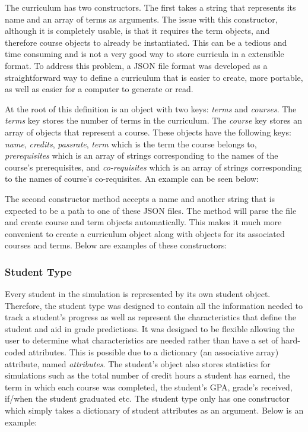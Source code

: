 \documentclass[botnum, fleqn]{unmeethesis}
\begin{document}
        The curriculum has two constructors. The first takes a string that represents its name and an array of terms as arguments. The issue with this constructor, although it is completely usable, is that it requires the term objects, and therefore course objects to already be instantiated. This can be a tedious and time consuming and is not a very good way to store curricula in a extensible format. To address this problem, a JSON file format was developed as a straightforward way to define a curriculum that is easier to create, more portable, as well as easier for a computer to generate or read.

        At the root of this definition is an object with two keys: \textit{terms} and \textit{courses}. The \textit{terms} key stores the number of terms in the curriculum. The \textit{course} key stores an array of objects that represent a course. These objects have the following keys: \textit{name}, \textit{credits}, \textit{passrate}, \textit{term} which is the term the course belongs to, \textit{prerequisites} which is an array of strings corresponding to the names of the course's prerequisites, and \textit{co-requisites} which is an array of strings corresponding to the names of course's co-requisites. An example can be seen below:

        

        The second constructor method accepts a name and another string that is expected to be a path to one of these JSON files. The method will parse the file and create course and term objects automatically. This makes it much more convenient to create a curriculum object along with objects for its associated courses and terms. Below are examples of these constructors:

        

      \subsubsection{Student Type}
        Every student in the simulation is represented by its own student object. Therefore, the student type was designed to contain all the information needed to track a student's progress as well as represent the characteristics that define the student and aid in grade predictions. It was designed to be flexible allowing the user to determine what characteristics are needed rather than have a set of hard-coded attributes. This is possible due to a dictionary (an associative array) attribute, named \textit{attributes}. The student's object also stores statistics for simulations such as the total number of credit hours a student has earned, the term in which each course was completed, the student's GPA, grade's received, if/when the student graduated etc. The student type only has one constructor which simply takes a dictionary of student attributes as an argument. Below is an example:
\end{document}
